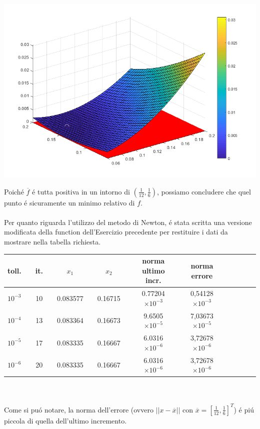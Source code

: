 \begin{center}
	\includegraphics[scale=0.7]{cap3/3_11_sign.png}
\end{center}

\noindent Poich\'e \(\overline{f}\) \'e tutta positiva in un intorno di \((\frac{1}{12}, \frac{1}{6})\), possiamo concludere che quel punto \'e sicuramente un minimo relativo di \(f\).
\\
\\
\noindent Per quanto riguarda l'utilizzo del metodo di Newton, \'e stata scritta una versione modificata della function dell'Esercizio precedente per restituire i dati da mostrare nella tabella richiesta.
\\


\begin{tabular}{l*{15}{c}}
 toll. & \vline& it. & \vline& \(x_1\) &\vline& \(x_2\) & \vline& norma ultimo incr. & \vline& norma errore\\
\hline
 \(10^{-3}\) & \vline& 10 & \vline& 0.083577& \vline& 0.16715 &\vline& 0.77204 \(\times 10^{-3}\) & \vline& 0,54128 \(\times 10^{-3}\) \\
 \(10^{-4}\) & \vline& 13 & \vline& 0.083364& \vline& 0.16673 &\vline& 9.6505 \(\times 10^{-5}\) & \vline& 7,03673 \(\times 10^{-5}\) \\
 \(10^{-5}\) & \vline& 17 & \vline& 0.083335& \vline& 0.16667 &\vline& 6.0316 \(\times 10^{-6}\) & \vline& 3,72678 \(\times 10^{-6}\) \\
 \(10^{-6}\) & \vline& 20 & \vline& 0.083335& \vline& 0.16667 &\vline& 6.0316 \(\times 10^{-6}\) & \vline& 3,72678 \(\times 10^{-6}\) \\
\end{tabular} \\
\\
\noindent Come si pu\'o notare, la norma dell'errore (ovvero \(||x - \overline{x}||\) con \(\overline{x} = [\frac{1}{12}, \frac{1}{6}]^T\)) \'e pi\'u piccola di quella dell'ultimo incremento.

